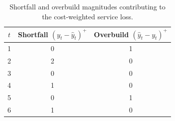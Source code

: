 \begin{table}[h!]
\centering
\begin{tabular}{c|c|c}
\hline
$t$ & Shortfall $(y_t - \hat{y}_t)^+$ & Overbuild $(\hat{y}_t - y_t)^+$ \\ \hline
1 & 0 & 1 \\
2 & 2 & 0 \\
3 & 0 & 0 \\
4 & 1 & 0 \\
5 & 0 & 1 \\
6 & 1 & 0 \\ \hline
\end{tabular}
\caption{Shortfall and overbuild magnitudes contributing to the cost-weighted service loss.}
\label{tab:frs_example_cost}
\end{table}
